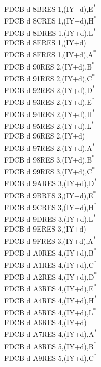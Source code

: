 \documentclass[twoside,openright,a4paper]{book}
\begin{document}
\begin{multicols}{3}
{\begin{tabbing}
	FDCB d 8B\>RES 1,(IY+d),E\textsuperscript{*}\\
	FDCB d 8C\>RES 1,(IY+d),H\textsuperscript{*}\\
	FDCB d 8D\>RES 1,(IY+d),L\textsuperscript{*}\\
	FDCB d 8E\>RES 1,(IY+d)\\
	FDCB d 8F\>RES 1,(IY+d),A\textsuperscript{*}\\
	FDCB d 90\>RES 2,(IY+d),B\textsuperscript{*}\\
	FDCB d 91\>RES 2,(IY+d),C\textsuperscript{*}\\
	FDCB d 92\>RES 2,(IY+d),D\textsuperscript{*}\\
	FDCB d 93\>RES 2,(IY+d),E\textsuperscript{*}\\
	FDCB d 94\>RES 2,(IY+d),H\textsuperscript{*}\\
	FDCB d 95\>RES 2,(IY+d),L\textsuperscript{*}\\
	FDCB d 96\>RES 2,(IY+d)\\
	FDCB d 97\>RES 2,(IY+d),A\textsuperscript{*}\\
	FDCB d 98\>RES 3,(IY+d),B\textsuperscript{*}\\
	FDCB d 99\>RES 3,(IY+d),C\textsuperscript{*}\\
	FDCB d 9A\>RES 3,(IY+d),D\textsuperscript{*}\\
	FDCB d 9B\>RES 3,(IY+d),E\textsuperscript{*}\\
	FDCB d 9C\>RES 3,(IY+d),H\textsuperscript{*}\\
	FDCB d 9D\>RES 3,(IY+d),L\textsuperscript{*}\\
	FDCB d 9E\>RES 3,(IY+d)\\
	FDCB d 9F\>RES 3,(IY+d),A\textsuperscript{*}\\
	FDCB d A0\>RES 4,(IY+d),B\textsuperscript{*}\\
	FDCB d A1\>RES 4,(IY+d),C\textsuperscript{*}\\
	FDCB d A2\>RES 4,(IY+d),D\textsuperscript{*}\\
	FDCB d A3\>RES 4,(IY+d),E\textsuperscript{*}\\
	FDCB d A4\>RES 4,(IY+d),H\textsuperscript{*}\\
	FDCB d A5\>RES 4,(IY+d),L\textsuperscript{*}\\
	FDCB d A6\>RES 4,(IY+d)\\
	FDCB d A7\>RES 4,(IY+d),A\textsuperscript{*}\\
	FDCB d A8\>RES 5,(IY+d),B\textsuperscript{*}\\
	FDCB d A9\>RES 5,(IY+d),C\textsuperscript{*}\\

\end{tabbing}}
\end{multicols}
\end{document}
